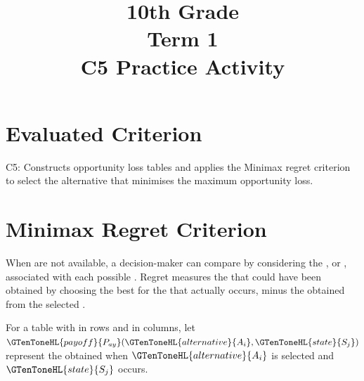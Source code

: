 \title{10th Grade \\ Term 1 \\ C5 Practice Activity}
\author{}
\date{}

\pagestyle{empty}


	
	\maketitle
	\vspace*{-2.5cm}
	
	
	\section*{Evaluated Criterion}
	
	C5: Constructs opportunity loss tables and applies the Minimax regret criterion to select the alternative that minimises the maximum opportunity loss.
	
	\section{Minimax Regret Criterion}
\label{tone:legend}

	
	When  are not available, a decision-maker can compare
	 by considering the  , or , associated
	with each possible   . Regret measures the  that could have been obtained by choosing the
	best  for the    that actually occurs, minus the
	 obtained from the selected .
	
	For a  table with  in rows and    in
	columns, let
	$
	\GTenToneHL{payoff}{P_{ay}}(\GTenToneHL{alternative}{A_i},\GTenToneHL{state}{S_j})
	$
	represent the  obtained when  $\GTenToneHL{alternative}{A_i}$ is selected and
	   $\GTenToneHL{state}{S_j}$ occurs.

